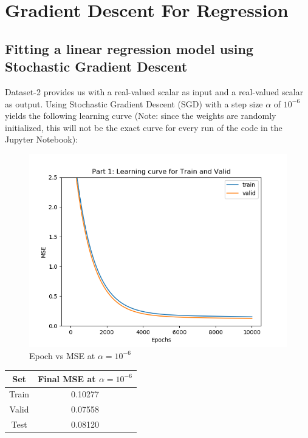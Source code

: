 \documentclass[paper=a4, fontsize=11pt]{scrartcl} %
\numberwithin{equation}{section} %
\numberwithin{figure}{section} %
\numberwithin{table}{section} %
\begin{document}

\section{Gradient Descent For Regression}
\subsection{Fitting a linear regression model using Stochastic Gradient Descent}

Dataset-2 provides us with a real-valued scalar as input and a real-valued scalar as output. Using Stochastic Gradient Descent (SGD) with a step size \(\alpha\) of \(10^{-6}\) yields the following learning curve (Note: since the weights are randomly initialized, this will not be the exact curve for every run of the code in the Jupyter Notebook):

\begin{figure}[H]
    \includegraphics[width=\linewidth]{q2p1.png}
    \caption{Epoch vs MSE at \(\alpha=10^{-6}\)}
    \label{fig:q2p1}
\end{figure}
\begin{center}
\begin{tabular}{ |c|c| } 
    \hline
    \textbf{Set} & \textbf{Final MSE at \(\alpha = 10^{-6}\)} \\ 
    \hline
    Train & 0.10277 \\
    Valid & 0.07558 \\ 
    Test & 0.08120 \\
    \hline
\end{tabular}
\end{center}
\end{document}
